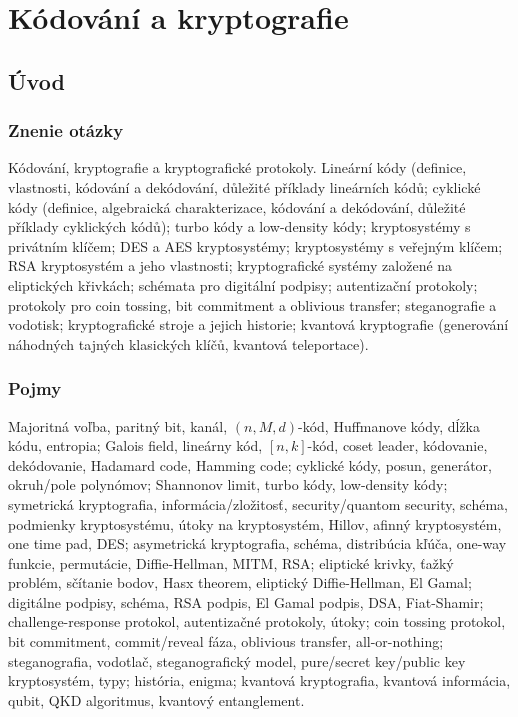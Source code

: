 \section{Kódování a kryptografie}

\subsection{Úvod}

\subsubsection*{Znenie otázky}

Kódování, kryptografie a kryptografické protokoly. Lineární 
kódy (definice, vlastnosti, kódování a dekódování, důležité příklady 
lineárních kódů; cyklické kódy (definice, algebraická charakterizace, 
kódování a dekódování, důležité příklady cyklických kódů); turbo 
kódy a low-density kódy; kryptosystémy s privátním klíčem; DES a AES 
kryptosystémy; kryptosystémy s veřejným klíčem; RSA kryptosystém a jeho 
vlastnosti; kryptografické systémy založené na eliptických křivkách; 
schémata pro digitální podpisy; autentizační protokoly; protokoly pro 
coin tossing, bit commitment a oblivious transfer; steganografie a vodotisk; 
kryptografické stroje a jejich historie; kvantová kryptografie (generování 
náhodných tajných klasických klíčů, kvantová teleportace).

\subsubsection*{Pojmy}
Majoritná voľba, paritný bit, kanál, $(n,M,d)$-kód, Huffmanove kódy,
dĺžka kódu, entropia; Galois field, lineárny kód, $[n,k]$-kód, coset
leader, kódovanie, dekódovanie, Hadamard code, Hamming code; cyklické 
kódy, posun, generátor, okruh/pole polynómov; Shannonov limit, turbo kódy,
low-density kódy; symetrická kryptografia, informácia/zložitosť, 
security/quantom security, schéma, podmienky kryptosystému, útoky na
kryptosystém, Hillov, afinný kryptosystém, one time pad, DES;
asymetrická kryptografia, schéma, distribúcia kľúča, one-way funkcie,
permutácie, Diffie-Hellman, MITM, RSA; eliptické krivky, ťažký problém,
sčítanie bodov, Hasx theorem, eliptický Diffie-Hellman, El Gamal;
digitálne podpisy, schéma, RSA podpis, El Gamal podpis, DSA, Fiat-Shamir;
challenge-response protokol, autentizačné protokoly, útoky;
coin tossing protokol, bit commitment, commit/reveal fáza, oblivious
transfer, all-or-nothing; steganografia, vodotlač, steganografický model,
pure/secret key/public key kryptosystém, typy; história, enigma;
kvantová kryptografia, kvantová informácia, qubit, QKD algoritmus, kvantový
entanglement.

